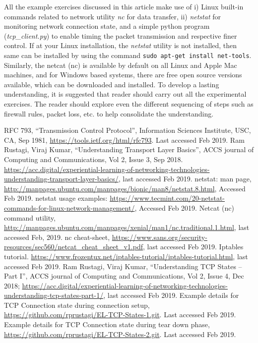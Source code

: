 \begin{multicols}{2}
All the example exercises discussed in this article make use of i) Linux built-in commands related to network utility \textit{nc} for data transfer, ii) \textit{netstat} for monitoring network connection state, and a simple python program (\textit{tcp\_client.py}) to enable timing the packet transmission and respective finer control. If at your Linux installation, the \textit{netstat} utility is not installed, then same can be installed by using the command \lstinline|sudo apt-get install net-tools|. Similarly, the netcat (nc) is available by default on all Linux and Apple Mac machines, and for Windows based systems, there are free open source versions available, which can be downloaded and installed. To develop a lasting understanding, it is suggested that reader should carry out all the experimental exercises. The reader should explore even the different sequencing of steps such as firewall rules, packet loss, etc. to help consolidate the understanding.

\begin{thebibliography}{99}
 RFC 793, ``Transmission Control Protocol'', Information Sciences Institute, USC, CA, Sep 1981, \url{https://tools.ietf.org/html/rfc793}. Last accessed Feb 2019.
 Ram Rustagi, Viraj Kumar, ``Understanding Transport Layer Basics'', ACCS journal of Computing and Communications, Vol 2, Issue 3, Sep 2018. \url{https://acc.digital/experiential-learning-of-networking-technologies-understanding-transport-layer-basics/}, last accessed Feb 2019.
 netstat: man page, \url{http://manpages.ubuntu.com/manpages/bionic/man8/netstat.8.html}, Accessed Feb 2019.
 netstat usage examples: \url{https://www.tecmint.com/20-netstat-commands-for-linux-network-management/}, Accessed Feb 2019.
 Netcat (nc) command utility, \url{http://manpages.ubuntu.com/manpages/xenial/man1/nc.traditional.1.html}, last accessed Feb, 2019.
 nc cheat-sheet, \url{https://www.sans.org/security-resources/sec560/netcat_cheat_sheet_v1.pdf}, last accessed Feb 2019.
 Iptables tutorial. \url{https://www.frozentux.net/iptables-tutorial/iptables-tutorial.html}, last accessed Feb 2019.
 Ram Rustagi, Viraj Kumar, ``Understanding TCP States -- Part I'', ACCS journal of Computing and Communications, Vol 2, Issue 4, Dec 2018; \url{https://acc.digital/experiential-learning-of-networking-technologies-understanding-tcp-states-part-1/}, last accessed Feb 2019.
 Example details for TCP Connection state during connection setup, \url{https://github.com/rprustagi/EL-TCP-States-1.git}. Last accessed Feb 2019.
 Example details for TCP Connection state during tear down phase, \url{https://github.com/rprustagi/EL-TCP-States-2.git}. Last accessed Feb 2019.
\end{thebibliography}
\end{multicols}
